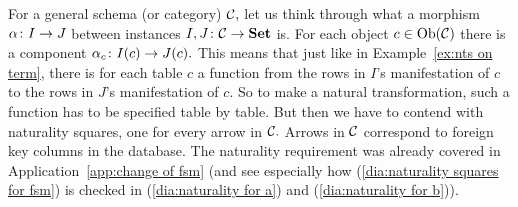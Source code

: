 \documentclass[../main/CT4S-EN-RU]{subfiles}
\begin{document}
\begin{exerciseRUS}\label{exc:indexed sets as functors}
\end{exerciseRUS}

\begin{blockENG}
For a general schema (or category) $\mathcal{C},$ let us think through what a morphism $\alpha\colon I\rightarrow J$ between instances $I,J\colon\mathcal{C}\rightarrow{\mathbf{Set}}$ is. For each object $c\in\operatorname{Ob}(\mathcal{C})$ there is a component $\alpha_c\colon I(c)\rightarrow J(c).$ This means that just like in Example~\ref{ex:nts on term}, there is for each table $c$ a function from the rows in $I$'s manifestation of $c$ to the rows in $J$'s manifestation of $c.$ So to make a natural transformation, such a function has to be specified table by table. But then we have to contend with naturality squares, one for every arrow in $\mathcal{C}.$ Arrows in $\mathcal{C}$ correspond to foreign key columns in the database. The naturality requirement was already covered in Application~\ref{app:change of fsm} (and see especially how (\ref{dia:naturality squares for fsm}) is checked in (\ref{dia:naturality for a}) and (\ref{dia:naturality for b})).
\end{blockENG}

\begin{blockRUS}
\end{blockRUS}
\end{document}
